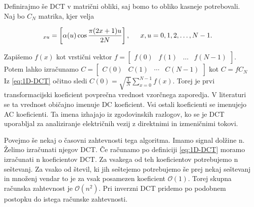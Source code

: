 \documentclass[a4paper,12pt,openright]{book}
\begin{document}
Definirajmo še DCT v matrični obliki, saj bomo to obliko kasneje potrebovali. Naj bo $C_N$ matrika, kjer velja

\begin{equation}
[C_N]_{xu} = \left[\alpha(u) \cos\frac{\pi(2x+1)u}{2N}\right], \indent 
x,u = 0,1,2,\ldots,N-1.
\label{eq:1D_DCT_matrika}
\end{equation}

Zapišemo $f(x)$ kot vrstični vektor \(f = 
\begin{bmatrix} 
f(0) & f(1) & \ldots & f(N-1)
\end{bmatrix}.
\)
Potem lahko izračunamo \(C =  
\begin{bmatrix} 
C(0) & C(1) & \cdots & C(N-1)
\end{bmatrix}
\)
kot $C = fC_N$
Iz \eqref{eq:1D-DCT} očitno sledi 
$C(0) = \sqrt{\frac{1}{N}} \sum_{x=0}^{N-1} f(x)$. Torej je prvi transformacijski koeficient povprečna vrednost vzorčnega zaporedja. V literaturi se ta vrednost običajno imenuje DC koeficient. Vsi ostali koeficienti se imenujejo AC koeficienti. Ta imena izhajajo iz zgodovinskih razlogov, ko se je DCT uporabljal za analiziranje električnih vezij z direktnimi in izmeničnimi tokovi. \par

Povejmo še nekaj o časovni zahtevnosti tega algoritma. Imamo signal dolžine n. Želimo izračunati njegov DCT. Če računamo po definiciji \eqref{eq:1D-DCT} moramo izračunati n koeficientov DCT. Za vsakega od teh koeficientov potrebujemo n seštevanj. Za vsako od števil, ki jih seštejemo potrebujemo še prej nekaj seštevanj in množenj vendar to je za vsak posamezen koeficient $\mathcal{O}(1)$. Torej skupna računska zahtevnost je $\mathcal{O}(n^2)$. Pri inverzni DCT pridemo po podobnem postopku do istega računske zahtevnosti. \par
\end{document}
